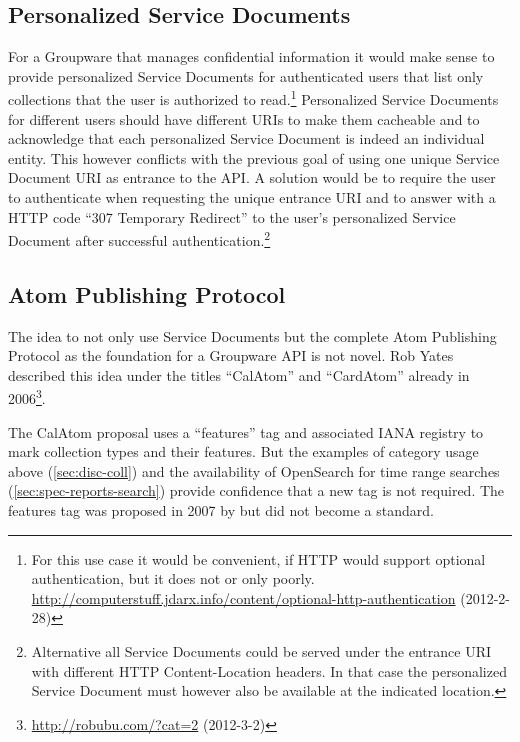 \documentclass[12pt,a4paper,twoside]{scrartcl}		%
\newcommand{\citeurl}[2]{\url{#1} (#2)}
\begin{document}
\subsection{Personalized Service Documents} For a Groupware that manages
confidential information it would make sense to provide personalized Service
Documents for authenticated users that list only collections that the user is
authorized to read.\footnote{For this use case it would be convenient, if HTTP
  would support optional authentication, but it does not or only
  poorly. \citeurl{http://computerstuff.jdarx.info/content/optional-http-authentication}{2012-2-28}}
Personalized Service Documents for different users should have different URIs to
make them cacheable and to acknowledge that each personalized Service Document
is indeed an individual entity. This however conflicts with the previous goal of
using one unique Service Document URI as entrance to the API. A solution would
be to require the user to authenticate when requesting the unique entrance URI
and to answer with a HTTP code ``307 Temporary Redirect'' to the user's
personalized Service Document after successful
authentication.\footnote{Alternative all Service Documents could be served under
  the entrance URI with different HTTP Content-Location
  headers\cite[sec. 14.14]{RFC2616}. In that case the personalized Service
  Document must however also be available at the indicated location.}


\subsection{Atom Publishing Protocol}
\label{sec:atom-publ-prot}

The idea to not only use Service Documents but the complete Atom Publishing
Protocol as the foundation for a Groupware API is not novel. Rob Yates described
this idea under the titles ``CalAtom'' and ``CardAtom'' already in
2006\footnote{\citeurl{http://robubu.com/?cat=2}{2012-3-2}}.

The CalAtom\cite{draft-yates-atompub-calatom-00.txt} proposal uses a
``features'' tag and associated IANA registry to mark collection types and their
features. But the examples of category usage above (\autoref{sec:disc-coll}) and
the availability of OpenSearch for time range searches
(\autoref{sec:spec-reports-search}) provide confidence that a new tag is not
required. The features tag was proposed in 2007 by
\cite{draft-snell-atompub-feature} but did not become a standard.
\end{document}
